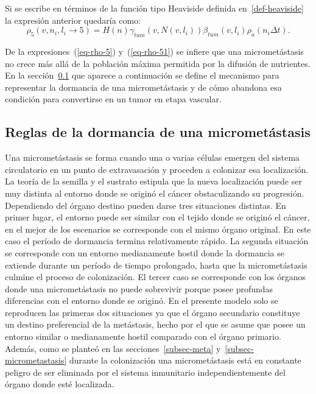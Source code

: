 Si se escribe en t\'erminos de la funci\'on tipo Heaviside definida en~\ref{def-heaviside} la expresi\'on anterior quedar\'ia como:
\begin{equation}
\rho_5(v,n_i,l_i \rightarrow 5) = H(n) \gamma_{tum}(v,N(v,l_i)) \beta_{tum}(v,l_i) \rho_a(n_i \Delta t). \label{eq-rho-51}
\end{equation}

De la expresiones~(\ref{eq-rho-5}) y~(\ref{eq-rho-51}) se infiere que una micromet\'astasis no crece m\'as all\'a de la poblaci\'on m\'axima permitida por la difusi\'on de nutrientes. En la secci\'on~\ref{subsec-dormancy} que aparece a continuaci\'on se define el mecanismo para representar la dormancia de una micromet\'astasis y de c\'omo abandona esa condici\'on para convertirse en un tumor en etapa vascular.

\subsection{Reglas de la dormancia de una micromet\'astasis}
\label{subsec-dormancy}
Una micromet\'astasis se forma cuando una o varias c\'elulas emergen del sistema circulatorio en un punto de extravasaci\'on y proceden a colonizar esa localizaci\'on. La teor\'ia de la semilla y el sustrato estipula que la nueva localizaci\'on puede ser muy distinta al entorno donde se origin\'o el c\'ancer obstaculizando su progresi\'on. Dependiendo del \'organo destino pueden darse tres situaciones distintas. En primer lugar, el entorno puede ser similar con el tejido donde se origin\'o el c\'ancer, en el mejor de los escenarios se corresponde con el mismo \'organo original. En este caso el per\'iodo de dormancia termina relativamente r\'apido. La segunda situaci\'on se corresponde con un entorno medianamente hostil donde la dormancia se extiende durante un per\'iodo de tiempo prolongado, hasta que la micromet\'astasis culmine el proceso de colonizaci\'on. El tercer caso se corresponde con los \'organos donde una micromet\'astasis no puede sobrevivir porque posee profundas diferencias con el entorno donde se origin\'o. En el presente modelo solo se reproducen las primeras dos situaciones ya que el \'organo secundario constituye un destino preferencial de la met\'astasis, hecho por el que se asume que posee un entorno similar o medianamente hostil comparado con el \'organo primario. Adem\'as, como se plante\'o en las secciones~\ref{subsec-meta} y~\ref{subsec-micrometastasis} durante la colonizaci\'on una micromet\'astasis est\'a en constante peligro de ser eliminada por el sistema inmunitario independientemente del \'organo donde est\'e localizada.

